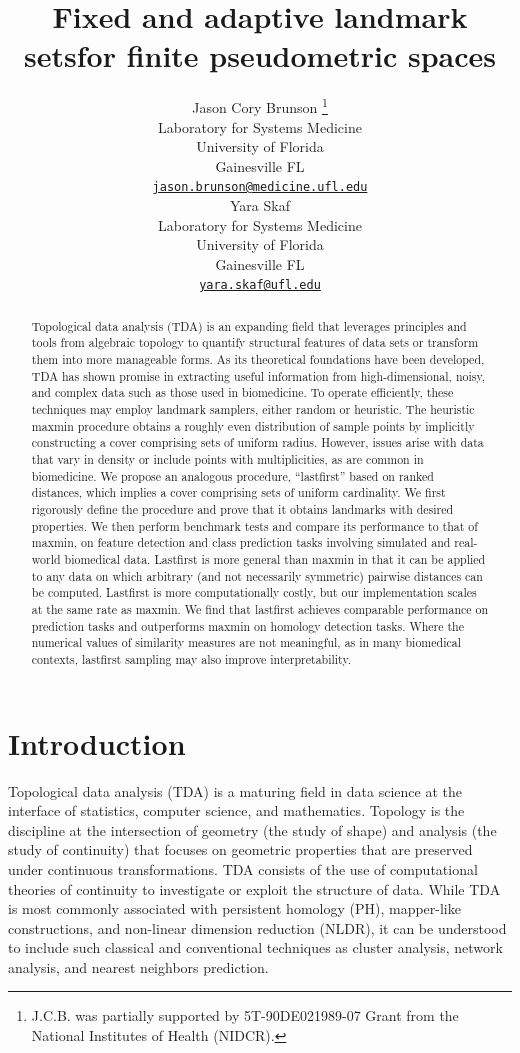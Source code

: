 \documentclass{article}
\title{Fixed and adaptive landmark sets\linebreak for finite
pseudometric spaces}
\author{
    Jason Cory Brunson
    \thanks{J.C.B. was partially supported by 5T-90DE021989-07 Grant
from the National Institutes of Health (NIDCR).}
   \\
    Laboratory for Systems Medicine \\
    University of Florida \\
  Gainesville FL \\
  \texttt{\href{mailto:jason.brunson@medicine.ufl.edu}{\nolinkurl{jason.brunson@medicine.ufl.edu}}} \\
   \And
    Yara Skaf
   \\
    Laboratory for Systems Medicine \\
    University of Florida \\
  Gainesville FL \\
  \texttt{\href{mailto:yara.skaf@ufl.edu}{\nolinkurl{yara.skaf@ufl.edu}}} \\
  }
\begin{document}
\maketitle


\begin{abstract}
Topological data analysis (TDA) is an expanding field that leverages
principles and tools from algebraic topology to quantify structural
features of data sets or transform them into more manageable forms. As
its theoretical foundations have been developed, TDA has shown promise
in extracting useful information from high-dimensional, noisy, and
complex data such as those used in biomedicine. To operate efficiently,
these techniques may employ landmark samplers, either random or
heuristic. The heuristic maxmin procedure obtains a roughly even
distribution of sample points by implicitly constructing a cover
comprising sets of uniform radius. However, issues arise with data that
vary in density or include points with multiplicities, as are common in
biomedicine. We propose an analogous procedure, ``lastfirst'' based on
ranked distances, which implies a cover comprising sets of uniform
cardinality. We first rigorously define the procedure and prove that it
obtains landmarks with desired properties. We then perform benchmark
tests and compare its performance to that of maxmin, on feature
detection and class prediction tasks involving simulated and real-world
biomedical data. Lastfirst is more general than maxmin in that it can be
applied to any data on which arbitrary (and not necessarily symmetric)
pairwise distances can be computed. Lastfirst is more computationally
costly, but our implementation scales at the same rate as maxmin. We
find that lastfirst achieves comparable performance on prediction tasks
and outperforms maxmin on homology detection tasks. Where the numerical
values of similarity measures are not meaningful, as in many biomedical
contexts, lastfirst sampling may also improve interpretability.
\end{abstract}


\hypertarget{introduction}{%
\section{Introduction}\label{introduction}}

Topological data analysis (TDA) is a maturing field in data science at
the interface of statistics, computer science, and mathematics. Topology
is the discipline at the intersection of geometry (the study of shape)
and analysis (the study of continuity) that focuses on geometric
properties that are preserved under continuous transformations. TDA
consists of the use of computational theories of continuity to
investigate or exploit the structure of data. While TDA is most commonly
associated with persistent homology (PH), mapper-like constructions, and
non-linear dimension reduction (NLDR), it can be understood to include
such classical and conventional techniques as cluster analysis, network
analysis, and nearest neighbors prediction.
\end{document}
